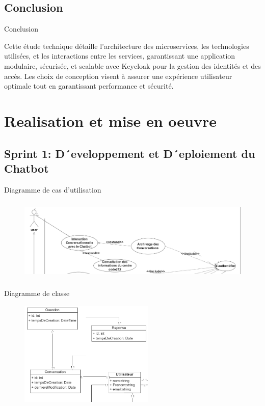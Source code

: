 \documentclass[aspectratio=169]{beamer}
\begin{document}
\subsection{Conclusion}
\begin{frame}{Conclusion}

    Cette étude technique détaille l'architecture des microservices, les technologies utilisées, et les interactions entre les services, garantissant une application modulaire, sécurisée, et scalable avec Keycloak pour la gestion des identités et des accès. Les choix de conception visent à assurer une expérience utilisateur optimale tout en garantissant performance et sécurité.
\end{frame}


\section{Realisation et mise en oeuvre}
\subsection{Sprint 1: D´eveloppement et D´eploiement du Chatbot}
\begin{frame}{Diagramme de cas d'utilisation}

    \begin{figure}[htpb]
        \centering
        \includegraphics[height=4cm]{pic/sprint1-usecase.png}
    \end{figure}
\end{frame}

\begin{frame}{Diagramme de classe}

    \begin{figure}[htpb]
        \centering
        \includegraphics[height=5cm]{pic/sprint1-class.png}
    \end{figure}
\end{frame}
\end{document}
